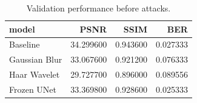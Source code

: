 
\begin{table}[h]
\centering

\caption{Validation performance before attacks.}
\label{tab:validation}

\begin{tabular}{lrrr}
\toprule
model & PSNR & SSIM & BER \\
\midrule
Baseline & 34.299600 & 0.943600 & 0.027333 \\
Gaussian Blur & 33.067600 & 0.921200 & 0.076333 \\
Haar Wavelet & 29.727700 & 0.896000 & 0.089556 \\
Frozen UNet & 33.369800 & 0.928600 & 0.025333 \\
\bottomrule
\end{tabular}


\end{table}
